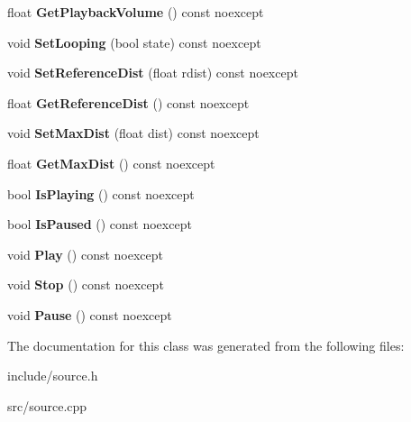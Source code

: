 \begin{DoxyCompactItemize}
\mbox{\label{class_blade_1_1_audio_source_a574b502ba98c588bbdebeb8c10f6f118}} 
float {\bfseries Get\+Playback\+Volume} () const noexcept
\item 
\mbox{\label{class_blade_1_1_audio_source_a48912e741c6f38e5bc1048373d79ce09}} 
void {\bfseries Set\+Looping} (bool state) const noexcept
\item 
\mbox{\label{class_blade_1_1_audio_source_a7037c88c499d146307814fdd6487b697}} 
void {\bfseries Set\+Reference\+Dist} (float rdist) const noexcept
\item 
\mbox{\label{class_blade_1_1_audio_source_a3af631375e1e2cf31edf79eff27502e7}} 
float {\bfseries Get\+Reference\+Dist} () const noexcept
\item 
\mbox{\label{class_blade_1_1_audio_source_a94fbc18291fb18dfc98751856411e982}} 
void {\bfseries Set\+Max\+Dist} (float dist) const noexcept
\item 
\mbox{\label{class_blade_1_1_audio_source_a688512119875d5be87789f9fab2a14de}} 
float {\bfseries Get\+Max\+Dist} () const noexcept
\item 
\mbox{\label{class_blade_1_1_audio_source_aba0f76eaa86fd06ee391bf1955d63a2b}} 
bool {\bfseries Is\+Playing} () const noexcept
\item 
\mbox{\label{class_blade_1_1_audio_source_a0ec6e8f896311a34b58656a199840484}} 
bool {\bfseries Is\+Paused} () const noexcept
\item 
\mbox{\label{class_blade_1_1_audio_source_a8f3245c3e67a68a54b4044c795657b8d}} 
void {\bfseries Play} () const noexcept
\item 
\mbox{\label{class_blade_1_1_audio_source_a87734411556d305a366f9e3e8c00dd54}} 
void {\bfseries Stop} () const noexcept
\item 
\mbox{\label{class_blade_1_1_audio_source_a4a27075da58751f49efbee1f3d3a5c86}} 
void {\bfseries Pause} () const noexcept
\end{DoxyCompactItemize}


The documentation for this class was generated from the following files\+:\begin{DoxyCompactItemize}
\item 
include/source.\+h\item 
src/source.\+cpp\end{DoxyCompactItemize}

